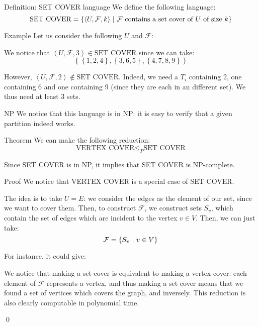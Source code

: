 \documentclass[a4paper]{article}
\begin{document}
\begin{parag}{Definition: SET COVER language}
    We define the following language:
    \[\text{SET COVER} = \left\{\left\langle U, \mathcal{F}, k \right\rangle \suchthat \text{$\mathcal{F}$ contains a set cover of $U$ of size $k$}\right\}\]

    \begin{subparag}{Example}
        Let us consider the following $U$ and $\mathcal{F}$:

        We notice that $\left\langle U, \mathcal{F},3 \right\rangle \in \text{SET COVER}$ since we can take: 
        \[\left\{\left\{1,2,4\right\}, \left\{3,6,5\right\}, \left\{4,7,8,9\right\}\right\}\]

        However, $\left\langle U, \mathcal{F}, 2 \right\rangle \not \in \text{SET COVER}$.  Indeed, we need a $T_i$ containing 2, one containing 6 and one containing 9 (since they are each in an different set). We thus need at least 3 sets.
    \end{subparag}

    \begin{subparag}{NP}
        We notice that this language is in NP: it is easy to verify that a given partition indeed works.
    \end{subparag}
\end{parag}

\begin{parag}{Theorem}
    We can make the following reduction: 
    \[\text{VERTEX COVER} \leq_P \text{SET COVER}\]
    
    Since SET COVER is in NP, it implies that SET COVER is NP-complete.

    \begin{subparag}{Proof}
        We notice that VERTEX COVER is a special case of SET COVER.

        The idea is to take $U = E$: we consider the edges as the element of our set, since we want to cover them. Then, to construct $\mathcal{F}$, we construct sets $S_v$, which contain the set of edges which are incident to the vertex $v \in V$. Then, we can just take: 
        \[\mathcal{F} = \left\{S_v \suchthat v \in V\right\}\]

        For instance, it could give:
    
        We notice that making a set cover is equivalent to making a vertex cover: each element of $\mathcal{F}$ represents a vertex, and thus making a set cover means that we found a set of vertices which covers the graph, and inversely. This reduction is also clearly computable in polynomial time.

        \qed
    \end{subparag}
\end{parag}
\end{document}
